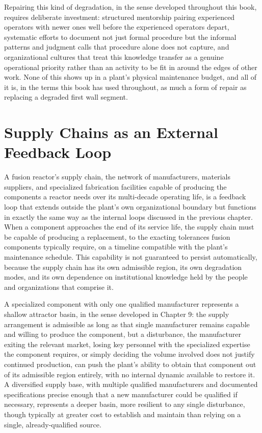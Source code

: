 Repairing this kind of degradation, in the sense developed throughout this book, requires deliberate investment: structured mentorship pairing experienced operators with newer ones well before the experienced operators depart, systematic efforts to document not just formal procedure but the informal patterns and judgment calls that procedure alone does not capture, and organizational cultures that treat this knowledge transfer as a genuine operational priority rather than an activity to be fit in around the edges of other work. None of this shows up in a plant's physical maintenance budget, and all of it is, in the terms this book has used throughout, as much a form of repair as replacing a degraded first wall segment.

\section{Supply Chains as an External Feedback Loop}

A fusion reactor's supply chain, the network of manufacturers, materials suppliers, and specialized fabrication facilities capable of producing the components a reactor needs over its multi-decade operating life, is a feedback loop that extends outside the plant's own organizational boundary but functions in exactly the same way as the internal loops discussed in the previous chapter. When a component approaches the end of its service life, the supply chain must be capable of producing a replacement, to the exacting tolerances fusion components typically require, on a timeline compatible with the plant's maintenance schedule. This capability is not guaranteed to persist automatically, because the supply chain has its own admissible region, its own degradation modes, and its own dependence on institutional knowledge held by the people and organizations that comprise it.

A specialized component with only one qualified manufacturer represents a shallow attractor basin, in the sense developed in Chapter 9: the supply arrangement is admissible as long as that single manufacturer remains capable and willing to produce the component, but a disturbance, the manufacturer exiting the relevant market, losing key personnel with the specialized expertise the component requires, or simply deciding the volume involved does not justify continued production, can push the plant's ability to obtain that component out of its admissible region entirely, with no internal dynamic available to restore it. A diversified supply base, with multiple qualified manufacturers and documented specifications precise enough that a new manufacturer could be qualified if necessary, represents a deeper basin, more resilient to any single disturbance, though typically at greater cost to establish and maintain than relying on a single, already-qualified source.

